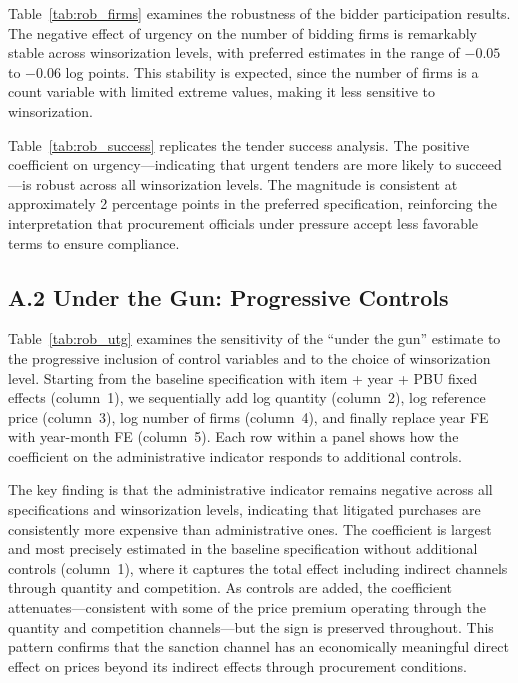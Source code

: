 

Table~\ref{tab:rob_firms} examines the robustness of the bidder participation results. The negative effect of urgency on the number of bidding firms is remarkably stable across winsorization levels, with preferred estimates in the range of $-0.05$ to $-0.06$ log points. This stability is expected, since the number of firms is a count variable with limited extreme values, making it less sensitive to winsorization.



Table~\ref{tab:rob_success} replicates the tender success analysis. The positive coefficient on urgency---indicating that urgent tenders are more likely to succeed---is robust across all winsorization levels. The magnitude is consistent at approximately 2 percentage points in the preferred specification, reinforcing the interpretation that procurement officials under pressure accept less favorable terms to ensure compliance.



\subsection*{A.2 Under the Gun: Progressive Controls}

Table~\ref{tab:rob_utg} examines the sensitivity of the ``under the gun'' estimate to the progressive inclusion of control variables and to the choice of winsorization level. Starting from the baseline specification with item + year + PBU fixed effects (column~1), we sequentially add log quantity (column~2), log reference price (column~3), log number of firms (column~4), and finally replace year FE with year-month FE (column~5). Each row within a panel shows how the coefficient on the administrative indicator responds to additional controls.

The key finding is that the administrative indicator remains negative across all specifications and winsorization levels, indicating that litigated purchases are consistently more expensive than administrative ones. The coefficient is largest and most precisely estimated in the baseline specification without additional controls (column~1), where it captures the total effect including indirect channels through quantity and competition. As controls are added, the coefficient attenuates---consistent with some of the price premium operating through the quantity and competition channels---but the sign is preserved throughout. This pattern confirms that the sanction channel has an economically meaningful direct effect on prices beyond its indirect effects through procurement conditions.

